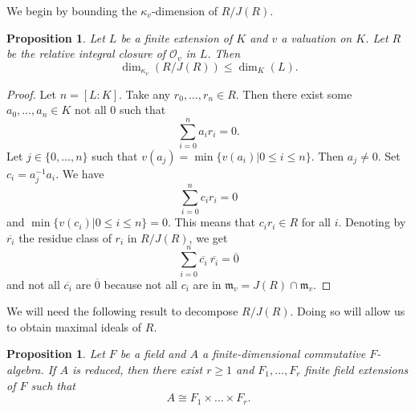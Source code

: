 \documentclass[12pt,a4paper]{amsart}
\newtheorem{prop}[thm]{Proposition}
\theoremstyle{definition}
\begin{document}
We begin by bounding the $\kappa_v$-dimension of $R/J(R)$.
\begin{prop}{\label{fin_dim}}
Let $L$ be a finite extension of $K$ and $v$ a valuation on $K$.
Let $R$ be the relative integral closure of $\mathcal{O}_v$ in $L$.
Then $$\dim_{\kappa_v}\left(R/J(R)\right)\leq\dim_K(L).$$
\end{prop}
\begin{proof}
Let $n=[L:K]$.
Take any $r_0,\ldots,r_n\in R$.
Then there exist some $a_0,\ldots,a_n\in K$ not all $0$ such that $$\sum_{i=0}^na_ir_i=0.$$
Let $j\in \{0,\ldots,n\}$ such that $v(a_j)=\min\{v(a_i)|0\leq i\leq n\}$.
Then $a_j\neq0$. Set $c_i=a_j^{-1}a_i$. We have $$\sum_{i=0}^nc_ir_i=0$$ and $\min\{v(c_i)|0\leq i\leq n\}=0$.
This means that $c_ir_i\in R$ for all $i$.
Denoting by $\overline{r_i}$ the residue class of $r_i$ in $R/J(R)$, we get $$\sum_{i=0}^n\overline{c_i}\ \overline{r_i}=\overline{0}$$
and not all $\overline{c_i}$ are $\overline{0}$ because not all $c_i$ are in $\mathfrak{m}_v=J(R)\cap\mathfrak{m}_v$.
\end{proof}
We will need the following result to decompose $R/J(R)$.
Doing so will allow us to obtain maximal ideals of $R$.
\begin{prop}{\label{product}}
Let $F$ be a field and $A$ a finite-dimensional commutative \hbox{$F$-algebra.}
If $A$ is reduced, then there exist $r\geq1$ and $F_1,\ldots,F_r$ finite field extensions of $F$ such that
$$A\cong F_1\times\ldots\times F_r.$$
\end{prop}
\end{document}
